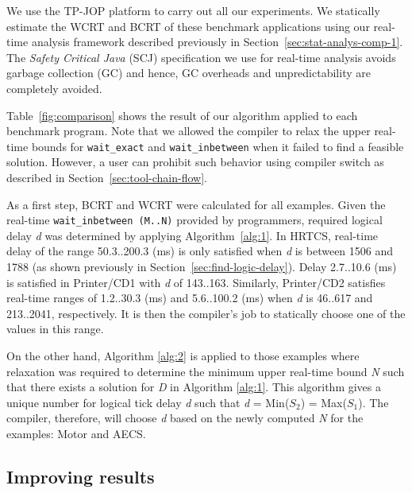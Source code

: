 We use the TP-JOP platform to carry out all our experiments. We
statically estimate the WCRT and BCRT of these benchmark applications
using our real-time analysis framework described previously in
Section~\ref{sec:stat-analys-comp-1}. The \textit{Safety Critical Java}
(SCJ) specification we use for real-time analysis avoids garbage
collection (GC) and hence, GC overheads and unpredictability are
completely avoided.


Table~\ref{fig:comparison} shows the result of our algorithm applied to
each benchmark program. Note that we allowed the compiler to relax the
upper real-time bounds for \texttt{wait\-\_exact} and
\texttt{wait\-\_inbetween} when it failed to find a feasible solution.
However, a user can prohibit such behavior using compiler switch as
described in Section~\ref{sec:tool-chain-flow}.

As a first step, BCRT and WCRT were calculated for all examples. Given
the real-time \texttt{wait\-\_inbetween (M..N)} provided by programmers,
required logical delay \textit{d} was determined by applying
Algorithm~\ref{alg:1}. In HRTCS, real-time delay of the range
50.3..200.3 (ms) is only satisfied when \emph{d} is between 1506 and
1788 (as shown previously in Section~\ref{sec:find-logic-delay}). Delay
2.7..10.6 (ms) is satisfied in Printer/CD1 with \emph{d} of 143..163.
Similarly, Printer/CD2 satisfies real-time ranges of 1.2..30.3 (ms) and
5.6..100.2 (ms) when \emph{d} is 46..617 and 213..2041, respectively. It
is then the compiler's job to statically choose one of the values in
this range.

On the other hand, Algorithm \ref{alg:2} is applied to those examples
where relaxation was required to determine the minimum upper real-time
bound \emph{N} such that there exists a solution for \emph{D} in
Algorithm \ref{alg:1}. This algorithm gives a unique number for logical
tick delay \emph{d} such that \emph{d} = Min(\emph{$S_2$}) =
Max(\emph{$S_1$}). The compiler, therefore, will choose \emph{d} based
on the newly computed \emph{N} for the examples: Motor and AECS.

\subsection{Improving results}

